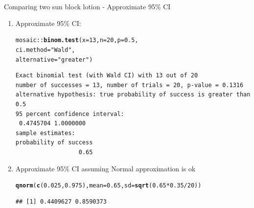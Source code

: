 \documentclass[handout]{beamer}\usepackage[]{graphicx}\usepackage[]{color}
\newcommand{\hlnum}[1]{\textcolor[rgb]{0.686,0.059,0.569}{#1}}%
\newcommand{\hlstr}[1]{\textcolor[rgb]{0.192,0.494,0.8}{#1}}%
\newcommand{\hlopt}[1]{\textcolor[rgb]{0,0,0}{#1}}%
\newcommand{\hlstd}[1]{\textcolor[rgb]{0.345,0.345,0.345}{#1}}%
\newcommand{\hlkwc}[1]{\textcolor[rgb]{0.333,0.667,0.333}{#1}}%
\newcommand{\hlkwd}[1]{\textcolor[rgb]{0.737,0.353,0.396}{\textbf{#1}}}%
\newenvironment{knitrout}{}{} %
\begin{document}
\begin{frame}[fragile]{Comparing two sun block lotion - Approximate 95\% CI}
\small
\begin{enumerate}
	\setlength\itemsep{1em}
	
	\item Approximate 95\% CI:
\begin{knitrout}\scriptsize
{}\color{fgcolor}
\begin{alltt}
\hlstd{mosaic}\hlopt{::}\hlkwd{binom.test}\hlstd{(}\hlkwc{x} \hlstd{=} \hlnum{13}\hlstd{,} \hlkwc{n} \hlstd{=} \hlnum{20}\hlstd{,} \hlkwc{p} \hlstd{=} \hlnum{0.5}\hlstd{,}
\hlkwc{ci.method} \hlstd{=} \hlstr{"Wald"}\hlstd{,}
\hlkwc{alternative} \hlstd{=} \hlstr{"greater"}\hlstd{)}
\end{alltt}
\begin{verbatim}
Exact binomial test (with Wald CI) with 13 out of 20 
number of successes = 13, number of trials = 20, p-value = 0.1316
alternative hypothesis: true probability of success is greater than 0.5 
95 percent confidence interval:
 0.4745704 1.0000000 
sample estimates:
probability of success 
                  0.65 
\end{verbatim}

\end{knitrout}
	
		
	\item Approximate 95\% CI assuming Normal approximation is ok 
\begin{knitrout}\scriptsize
{}\color{fgcolor}
\begin{alltt}
\hlkwd{qnorm}\hlstd{(}\hlkwd{c}\hlstd{(}\hlnum{0.025}\hlstd{,} \hlnum{0.975}\hlstd{),} \hlkwc{mean} \hlstd{=} \hlnum{0.65}\hlstd{,} \hlkwc{sd} \hlstd{=} \hlkwd{sqrt}\hlstd{(}\hlnum{0.65}\hlopt{*}\hlnum{0.35} \hlopt{/} \hlnum{20}\hlstd{))}
\end{alltt}
\begin{verbatim}
## [1] 0.4409627 0.8590373
\end{verbatim}

\end{knitrout}
	
\end{enumerate}

\end{frame}
\end{document}
